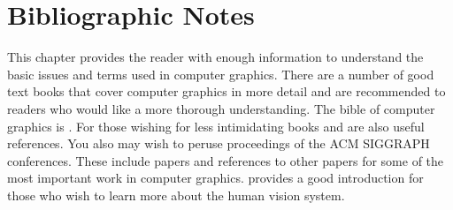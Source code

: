 \section{Bibliographic Notes}
\label{Ch03BibNotes}
This chapter provides the reader with enough information to understand the basic issues and terms used in computer graphics. There are a number of good text books that cover computer graphics in more detail and are recommended to readers who would like a more thorough understanding. The bible of computer graphics is \cite{FoleyVanDam90}. For those wishing for less intimidating books \cite{BurgerGillies89} and \cite{Watt93} are also useful references. You also may wish to peruse proceedings of the ACM SIGGRAPH conferences. These include papers and references to other papers for some of the most important work in computer graphics. \cite{Carlson85} provides a good introduction for those who wish to learn more about the human vision system.


\printbibliography


